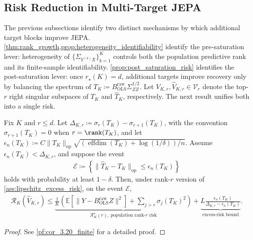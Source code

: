\subsection{Risk Reduction in Multi-Target JEPA}
\label{sec:two_stage_risk_reduction}

The previous subsections identify two distinct mechanisms by which additional target blocks improve JEPA.  
\cref{thm:rank_growth,prop:heterogeneity_identifiability} identify the pre-saturation lever: heterogeneity of $\{\Sigma_{Y^{(k)}X}\}_{k=1}^K$ controls both the population predictive rank and its finite-sample identifiability.
\cref{prop:post_saturation_risk} identifies the post-saturation lever: once $r_\star(K)=d$, additional targets improve recovery only by balancing the spectrum of $T_K\coloneqq B_{\mathrm{OLS}}^{\mathrm{raw}}\Sigma_{ZZ}^{1/2}$.
Let $V_{K,r},\widehat V_{K,r}\in\mathcal V_r$ denote the top-$r$ right singular subspaces of $T_K$ and $\widehat T_K$, respectively.
The next result unifies both into a single risk.
\begin{proposition}
\label{prop:unified_risk_decomposition}
Fix $K$ and $r\le d$. 
Let $\Delta_{K,r}\coloneqq \sigma_r(T_K)-\sigma_{r+1}(T_K)$, with the convention $\sigma_{r+1}(T_K)=0$ when $r=\rank(T_K)$, and let $\epsilon_n(T_K)\coloneqq C\|T_K\|_{\mathrm{op}} \sqrt{(\operatorname{effdim}(T_K)+\log(1/\delta))/n}$. 
Assume $\epsilon_n(T_K)<\Delta_{K,r}$, and suppose the event
\begin{align*}
    \mathcal E
    \coloneqq
    \left\{
    \|\widehat T_K-T_K\|_{\mathrm{op}}\le \epsilon_n(T_K)
    \right\}
\end{align*}
holds with probability at least $1-\delta$. 
Then, under rank-$r$ version of \cref{ass:lipschitz_excess_risk}, on the event $\mathcal E$,
\begin{align}
\label{eq:unified_risk_bound}
    \mathcal R_K(\widehat V_{K,r})
    \le
    \underbrace{
    \frac{1}{K}\left( \mathbb E\!\left[\|Y-B_{\mathrm{OLS}}^{\mathrm{raw}}Z\|^2\right] +\sum_{j>r}\sigma_j(T_K)^2\right)
    }_{\mathcal R_K^\star(r),\ \text{population rank-}r\text{ risk} }
    +
    \underbrace{
    L\frac{\epsilon_n(T_K)}
    {\Delta_{K,r}-\epsilon_n(T_K)}
    }_{\text{excess-risk bound}} .
\end{align}
\end{proposition}
\begin{proof}
See \cref{pf:cor_3.20_finite} for a detailed proof.
\end{proof}

